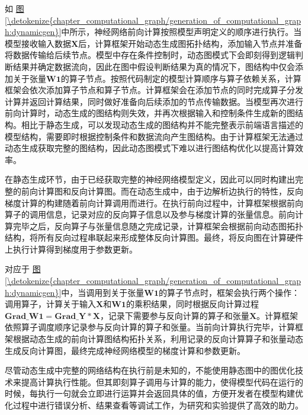 \documentclass[letterpaper,10pt,english]{sphinxmanual}
\begin{document}
\sphinxAtStartPar
如
\hyperref[\detokenize{chapter_computational_graph/generation_of_computational_graph:dynamicgen}]{图\ref{\detokenize{chapter_computational_graph/generation_of_computational_graph:dynamicgen}}}中所示，神经网络前向计算按照模型声明定义的顺序进行执行。当模型接收输入数据\(\boldsymbol{X}\)后，计算框架开始动态生成图拓扑结构，添加输入节点并准备将数据传输给后续节点。模型中存在条件控制时，动态图模式下会即刻得到逻辑判断结果并确定数据流向，因此在图中假设判断结果为真的情况下，图结构中仅会添加关于张量\(\boldsymbol{W1}\)的算子节点。按照代码制定的模型计算顺序与算子依赖关系，计算框架会依次添加算子节点和算子节点。计算框架会在添加节点的同时完成算子分发计算并返回计算结果，同时做好准备向后续添加的节点传输数据。当模型再次进行前向计算时，动态生成的图结构则失效，并再次根据输入和控制条件生成新的图结构。相比于静态生成，可以发现动态生成的图结构并不能完整表示前端语言描述的模型结构，需要即时根据控制条件和数据流向产生图结构。由于计算框架无法通过动态生成获取完整的图结构，因此动态图模式下难以进行图结构优化以提高计算效率。

\sphinxAtStartPar
在静态生成环节，由于已经获取完整的神经网络模型定义，因此可以同时构建出完整的前向计算图和反向计算图。而在动态生成中，由于边解析边执行的特性，反向梯度计算的构建随着前向计算调用而进行。在执行前向过程中，计算框架根据前向算子的调用信息，记录对应的反向算子信息以及参与梯度计算的张量信息。前向计算完毕之后，反向算子与张量信息随之完成记录，计算框架会根据前向动态图拓扑结构，将所有反向过程串联起来形成整体反向计算图。最终，将反向图在计算硬件上执行计算得到梯度用于参数更新。

\sphinxAtStartPar
对应于
\hyperref[\detokenize{chapter_computational_graph/generation_of_computational_graph:dynamicgen}]{图\ref{\detokenize{chapter_computational_graph/generation_of_computational_graph:dynamicgen}}}中，当调用到关于张量\(\boldsymbol{W1}\)的算子节点时，框架会执行两个操作：调用算子，计算关于输入\(\boldsymbol{X}\)和\(\boldsymbol{W1}\)的乘积结果，同时根据反向计算过程\(\boldsymbol{Grad\_W1}=\boldsymbol{Grad\_Y}*\boldsymbol{X}\)，记录下需要参与反向计算的算子和张量\(\boldsymbol{X}\)。计算框架依照算子调度顺序记录参与反向计算的算子和张量。当前向计算执行完毕，计算框架根据动态生成的前向计算图结构拓扑关系，利用记录的反向计算算子和张量动态生成反向计算图，最终完成神经网络模型的梯度计算和参数更新。

\sphinxAtStartPar
尽管动态生成中完整的网络结构在执行前是未知的，不能使用静态图中的图优化技术来提高计算执行性能。但其即刻算子调用与计算的能力，使得模型代码在运行的时候，每执行一句就会立即进行运算并会返回具体的值，方便开发者在模型构建优化过程中进行错误分析、结果查看等调试工作，为研究和实验提供了高效的助力。
\end{document}
